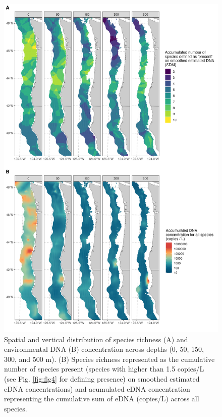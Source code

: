 \documentclass{article}
\begin{document}
\begin{figure}[tbhp] 
\centering
\includegraphics[width=13cm]{plots/3_Figure_3.jpg} 
\caption{Spatial and vertical distribution of species richness (A) and environmental DNA (B) concentration across depths (0, 50, 150, 300, and 500 m). (B) Species richness represented as the cumulative number of species present (species with higher than 1.5 copies/L (see Fig. \ref{fig:fig4} for defining presence) on smoothed estimated eDNA concentrations) and acumulated eDNA concentration representing the cumulative sum of eDNA (copies/L) across all species.}
\label{fig:fig3}
\end{figure}
\end{document}
